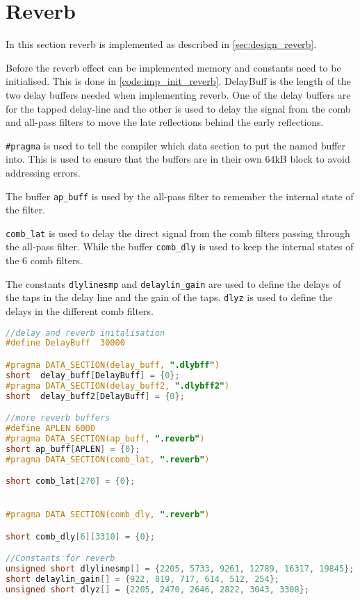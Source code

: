 \section{Reverb}
\label{sec:imp_reverb}
In this section reverb is implemented as described in \autoref{sec:design_reverb}.

Before the reverb effect can be implemented memory and constants need to be initialised. This is done in \autoref{code:imp_init_reverb}. DelayBuff is the length of the two delay buffers needed when implementing reverb. One of the delay buffers are for the tapped delay-line and the other is used to delay the signal from the comb and all-pass filters to move the late reflections behind the early reflections.

\texttt{\#pragma} is used to tell the compiler which data section to put the named buffer into. This is used to ensure that the buffers are in their own 64kB block to avoid addressing errors.

The buffer \texttt{ap_buff} is used by the all-pass filter to remember the internal state of the filter.

\texttt{comb_lat} is used to delay the direct signal from the comb filters passing through the all-pass filter. While the buffer \texttt{comb_dly} is used to keep the internal states of the 6 comb filters. 

The constants \texttt{dlylinesmp} and \texttt{delaylin_gain} are used to define the delays of the taps in the delay line and the gain of the taps. \texttt{dlyz} is used to define the delays in the different comb filters.
\begin{lstlisting}[caption={Initialisation of reverb.},language=C,label={code:imp_init_reverb},tabsize=2]
//delay and reverb initalisation
#define DelayBuff  30000

#pragma DATA_SECTION(delay_buff, ".dlybff")
short  delay_buff[DelayBuff] = {0};
#pragma DATA_SECTION(delay_buff2, ".dlybff2")
short  delay_buff2[DelayBuff] = {0};

//more reverb buffers
#define APLEN 6000
#pragma DATA_SECTION(ap_buff, ".reverb")
short ap_buff[APLEN] = {0};
#pragma DATA_SECTION(comb_lat, ".reverb")

short comb_lat[270] = {0};


#pragma DATA_SECTION(comb_dly, ".reverb")

short comb_dly[6][3310] = {0};

//Constants for reverb
unsigned short dlylinesmp[] = {2205, 5733, 9261, 12789, 16317, 19845};
short delaylin_gain[] = {922, 819, 717, 614, 512, 254};
unsigned short dlyz[] = {2205, 2470, 2646, 2822, 3043, 3308};
\end{lstlisting}

